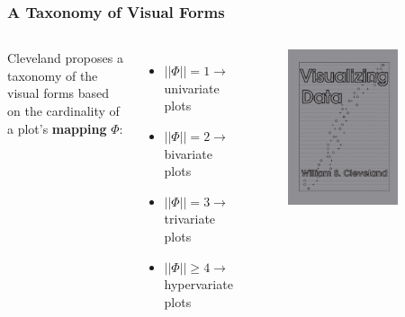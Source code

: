 \documentclass[aspectratio=1610]{beamer}
\begin{document}
\begin{frame}
	\frametitle{A Taxonomy of Visual Forms}
	\begin{columns}
		Cleveland \parencite{clevelandVisualizingData1993} proposes a taxonomy
		of the visual forms based on the cardinality of a plot's \textbf{mapping}
		$\Phi$:

		\begin{itemize}
			\item $||\Phi|| = 1 \rightarrow$ univariate plots
			\item $||\Phi|| = 2 \rightarrow$ bivariate plots
			\item $||\Phi|| = 3 \rightarrow$ trivariate plots
			\item $||\Phi|| \geq 4 \rightarrow$ hypervariate plots
		\end{itemize}
		\begin{figure}
			\begin{center}
				\includegraphics[width=0.8\textwidth]{figures/cleveland.jpg}
			\end{center}
		\end{figure}
	\end{columns}
\end{frame}
\end{document}
